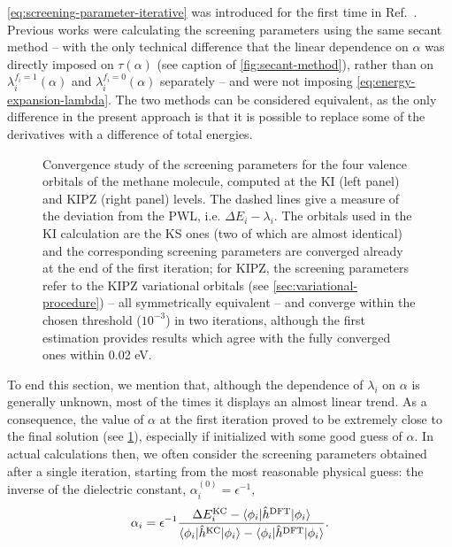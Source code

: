 \cref{eq:screening-parameter-iterative} was introduced for the first time in Ref.~\cite{nguyen_koopmans-compliant_2018}. Previous works were calculating the screening parameters using the same secant method -- with the only technical difference that the linear dependence on $\alpha$ was directly imposed on $\tau(\alpha)$ (see caption of \cref{fig:secant-method}), rather than on $\lambda_i^{f_i=1}(\alpha)$ and $\lambda_i^{f_i=0}(\alpha)$ separately -- and were not imposing \cref{eq:energy-expansion-lambda}. The two methods can be considered equivalent, as the only difference in the present approach is that it is possible to replace some of the derivatives with a difference of total energies.

\begin{figure}
    \centering
     \qquad
    \caption[Convergence of screening parameters]{Convergence study of the screening parameters for the four valence orbitals of the methane molecule, computed at the KI (left panel) and KIPZ (right panel) levels. The dashed lines give a measure of the deviation from the PWL, i.e. $\Delta E_i - \lambda_i$. The orbitals used in the KI calculation are the KS ones (two of which are almost identical) and the corresponding screening parameters are converged already at the end of the first iteration; for KIPZ, the screening parameters refer to the KIPZ variational orbitals (see \cref{sec:variational-procedure}) -- all symmetrically equivalent -- and converge within the chosen threshold ($10^{-3}$) in two iterations, although the first estimation provides results which agree with the fully converged ones within 0.02 eV.}
    \label{fig:alphas-convergence}
\end{figure}

To end this section, we mention that, although the dependence of $\lambda_i$ on $\alpha$ is generally unknown, most of the times it displays an almost linear trend. As a consequence, the value of $\alpha$ at the first iteration proved to be extremely close to the final solution (see \cref{fig:alphas-convergence}), especially if initialized with some good guess of $\alpha$. In actual calculations then, we often consider the screening parameters obtained after a single iteration, starting from the most reasonable physical guess: the inverse of the dielectric constant, $\alpha_i^{(0)} = \epsilon^{-1}$,
%
\begin{equation}
    \alpha_i = \epsilon^{-1} \frac{\Delta E^{\rm KC}_i - \braket{\phi_i|\hat{h}^{\rm DFT}|\phi_i}}{\braket{\phi_i|\hat{h}^{\rm KC}|\phi_i} - \braket{\phi_i|\hat{h}^{\rm DFT}|\phi_i}} .
    \label{eq:screening-parameter-dscf}
\end{equation}


